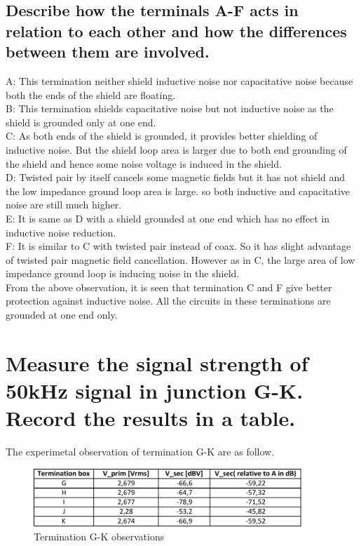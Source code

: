 \documentclass[12pt,a4paper,UKenglish]{article}
\begin{document}
\subsection{Describe how the terminals A-F acts in relation to each other and how the differences between them are involved.}
A: This termination neither shield inductive noise nor capacitative noise because both the ends of the shield are floating. \\
B: This termination shields capacitative noise but not inductive noise as the shield is grounded only at one end. \\
C: As both ends of the shield is grounded, it provides better shielding of inductive noise. But the shield loop area is larger due to both end grounding of the shield and hence some noise voltage is induced in the shield.\\
D: Twisted pair by itself cancels some magnetic fields but it has not shield and the low impedance ground loop area is large. so both inductive and capacitative noise are still much higher. \\
E: It is same as D with a shield grounded at one end which has no effect in inductive noise reduction. \\
F: It is similar to C with twisted pair instead of coax. So it has slight advantage of twisted pair magnetic field cancellation. However as in C, the large area of low impedance ground loop is inducing noise in the shield. \\
From the above observation, it is seen that termination C and F give better protection against inductive noise.  All the circuits in these terminations are grounded at one end only.

\section{Measure the signal strength of 50kHz signal in junction G-K. Record the results in a table.}
The experimetal observation of termination G-K are as follow.
\begin{figure} [H] %
  \centering 
  \includegraphics[width=0.9\textwidth]{img/task6_data.pdf} 
  \caption{Termination G-K observations}
  \label{fig:task6b} 
\end{figure}
\end{document}

